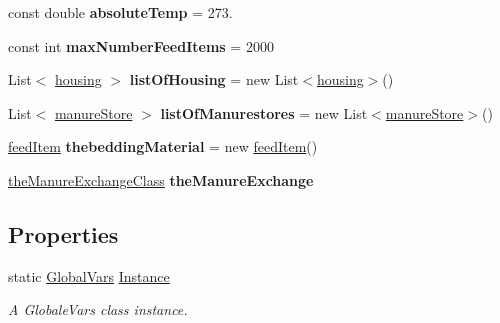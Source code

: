 \begin{DoxyCompactItemize}
\mbox{\label{class_global_vars_a31a168417d1ba6735c7a7014f2d12a33}} 
const double {\bfseries absolute\+Temp} = 273.
\item 
\mbox{\label{class_global_vars_a42fa58d4be2a863e36b4ec8e8bee69cd}} 
const int {\bfseries max\+Number\+Feed\+Items} = 2000
\item 
\mbox{\label{class_global_vars_aeba83240bfe09b5b7c59185674f232b6}} 
List$<$ \mbox{\hyperlink{classhousing}{housing}} $>$ {\bfseries list\+Of\+Housing} = new List$<$\mbox{\hyperlink{classhousing}{housing}}$>$()
\item 
\mbox{\label{class_global_vars_a87f4d7b7be35a15d8f7a7b02eff17435}} 
List$<$ \mbox{\hyperlink{classmanure_store}{manure\+Store}} $>$ {\bfseries list\+Of\+Manurestores} = new List$<$\mbox{\hyperlink{classmanure_store}{manure\+Store}}$>$()
\item 
\mbox{\label{class_global_vars_ac5b724d8af7c0aa33718a1ed78fdfb8e}} 
\mbox{\hyperlink{classfeed_item}{feed\+Item}} {\bfseries thebedding\+Material} = new \mbox{\hyperlink{classfeed_item}{feed\+Item}}()
\item 
\mbox{\label{class_global_vars_ac914a91c129f5e72dd711864e8aea1f8}} 
\mbox{\hyperlink{class_global_vars_1_1the_manure_exchange_class}{the\+Manure\+Exchange\+Class}} {\bfseries the\+Manure\+Exchange}
\end{DoxyCompactItemize}
\subsection*{Properties}
\begin{DoxyCompactItemize}
\item 
static \mbox{\hyperlink{class_global_vars}{Global\+Vars}} \mbox{\hyperlink{class_global_vars_ab848514ffc2a60c2c1642ff113f4293d}{Instance}}
\begin{DoxyCompactList}\small\item\em A Globale\+Vars class instance. \end{DoxyCompactList}\end{DoxyCompactItemize}


